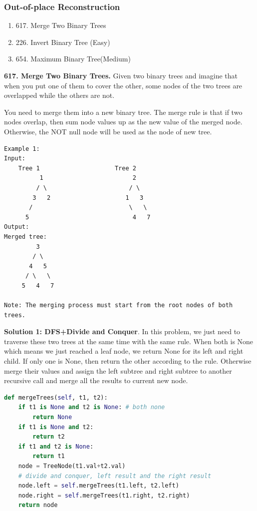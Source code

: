 \documentclass[../main.tex]{subfiles}
\begin{document}
\subsubsection{Out-of-place Reconstruction}
\begin{enumerate}
    \item 617. Merge Two Binary Trees
    \item 226. Invert Binary Tree (Easy)
    \item 654. Maximum Binary Tree(Medium)
\end{enumerate}
\begin{examples}[resume]
\item \textbf{617. Merge Two Binary Trees.} Given two binary trees and imagine that when you put one of them to cover the other, some nodes of the two trees are overlapped while the others are not.

You need to merge them into a new binary tree. The merge rule is that if two nodes overlap, then sum node values up as the new value of the merged node. Otherwise, the NOT null node will be used as the node of new tree.
\begin{lstlisting}[numbers=none]
Example 1:
Input: 
	Tree 1                     Tree 2                  
          1                         2     
         / \                       / \              
        3   2                     1   3                  
       /                           \   \                
      5                             4   7                
Output: 
Merged tree:
	     3
	    / \
	   4   5
	  / \   \ 
	 5   4   7

Note: The merging process must start from the root nodes of both trees.
\end{lstlisting}
\textbf{Solution 1: DFS+Divide and Conquer}. In this problem, we just need to traverse these two trees at the same time with the same rule. When both is None which means we just reached a leaf node, we return None for its left and right child. If only one is None, then return the other according to the rule. Otherwise merge their values and assign the left subtree and right subtree to another recursive call and merge all the results to current new node.
\begin{lstlisting}[language=Python]
def mergeTrees(self, t1, t2):
    if t1 is None and t2 is None: # both none
        return None
    if t1 is None and t2:
        return t2
    if t1 and t2 is None:
        return t1
    node = TreeNode(t1.val+t2.val)
    # divide and conquer, left result and the right result
    node.left = self.mergeTrees(t1.left, t2.left)
    node.right = self.mergeTrees(t1.right, t2.right)
    return node
\end{lstlisting}


\end{examples}
\end{document}

